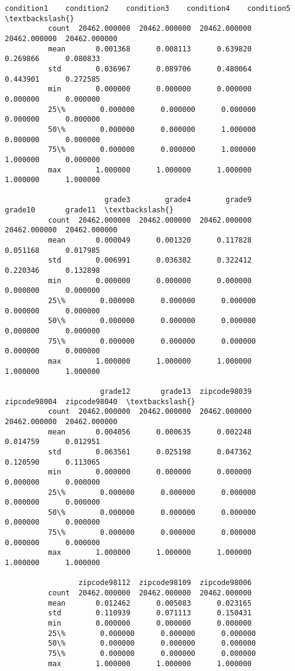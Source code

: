 \documentclass[11pt]{article}
\begin{document}
\begin{Verbatim}[commandchars=\\\{\}]
                   condition1    condition2    condition3    condition4    condition5  \textbackslash{}
          count  20462.000000  20462.000000  20462.000000  20462.000000  20462.000000   
          mean       0.001368      0.008113      0.639820      0.269866      0.080833   
          std        0.036967      0.089706      0.480064      0.443901      0.272585   
          min        0.000000      0.000000      0.000000      0.000000      0.000000   
          25\%        0.000000      0.000000      0.000000      0.000000      0.000000   
          50\%        0.000000      0.000000      1.000000      0.000000      0.000000   
          75\%        0.000000      0.000000      1.000000      1.000000      0.000000   
          max        1.000000      1.000000      1.000000      1.000000      1.000000   
          
                       grade3        grade4        grade9       grade10       grade11  \textbackslash{}
          count  20462.000000  20462.000000  20462.000000  20462.000000  20462.000000   
          mean       0.000049      0.001320      0.117828      0.051168      0.017985   
          std        0.006991      0.036302      0.322412      0.220346      0.132898   
          min        0.000000      0.000000      0.000000      0.000000      0.000000   
          25\%        0.000000      0.000000      0.000000      0.000000      0.000000   
          50\%        0.000000      0.000000      0.000000      0.000000      0.000000   
          75\%        0.000000      0.000000      0.000000      0.000000      0.000000   
          max        1.000000      1.000000      1.000000      1.000000      1.000000   
          
                      grade12       grade13  zipcode98039  zipcode98004  zipcode98040  \textbackslash{}
          count  20462.000000  20462.000000  20462.000000  20462.000000  20462.000000   
          mean       0.004056      0.000635      0.002248      0.014759      0.012951   
          std        0.063561      0.025198      0.047362      0.120590      0.113065   
          min        0.000000      0.000000      0.000000      0.000000      0.000000   
          25\%        0.000000      0.000000      0.000000      0.000000      0.000000   
          50\%        0.000000      0.000000      0.000000      0.000000      0.000000   
          75\%        0.000000      0.000000      0.000000      0.000000      0.000000   
          max        1.000000      1.000000      1.000000      1.000000      1.000000   
          
                 zipcode98112  zipcode98109  zipcode98006  
          count  20462.000000  20462.000000  20462.000000  
          mean       0.012462      0.005083      0.023165  
          std        0.110939      0.071113      0.150431  
          min        0.000000      0.000000      0.000000  
          25\%        0.000000      0.000000      0.000000  
          50\%        0.000000      0.000000      0.000000  
          75\%        0.000000      0.000000      0.000000  
          max        1.000000      1.000000      1.000000  
\end{Verbatim}
            
\end{document}
